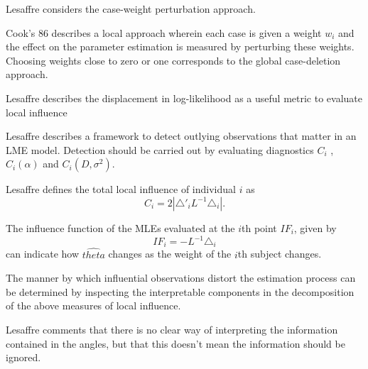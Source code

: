\documentclass[MAIN.tex]{subfiles}
\begin{document}
Lesaffre considers the case-weight perturbation approach.


Cook's 86 describes a local approach wherein each case is given a weight $w_{i}$ and the effect on the parameter estimation is measured by perturbing these weights. Choosing weights close to zero or one corresponds to the global case-deletion approach.

Lesaffre  describes the displacement in log-likelihood as a useful metric to evaluate local influence %


Lesaffre describes a framework to detect outlying observations that matter in an LME model. Detection should be carried out by evaluating diagnostics $C_{i}$ , $C_{i}(\alpha)$ and $C_{i}(D,\sigma^2)$.


Lesaffre defines the total local influence of individual $i$ as
\begin{equation}
C_{i} = 2 | \triangle \prime _{i} L^{-1} \triangle_{i}|.
\end{equation}


The influence function of the MLEs evaluated at the $i$th point $IF_{i}$, given by
\begin{equation}
IF_{i} = -L^{-1}\triangle _{i}
\end{equation}
can indicate how $\hat{theta}$ changes as the weight of the $i$th
subject changes.

The manner by which influential observations distort the estimation process can be determined by inspecting the
interpretable components in the decomposition of the above measures of local influence.


Lesaffre comments that there is no clear way of interpreting the information contained in the angles, but that this doesn't mean the information should be ignored.


\end{document}
